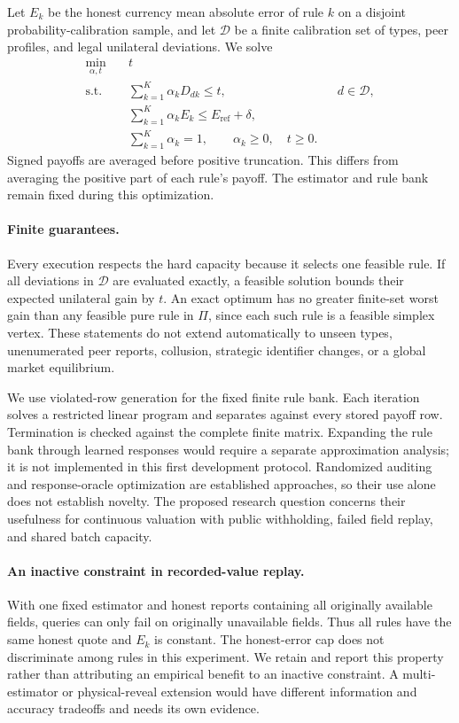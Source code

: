 \documentclass[10pt]{article}
\begin{document}
Let $E_k$ be the honest currency mean absolute error of rule $k$ on a disjoint
probability-calibration sample, and let $\mathcal{D}$ be a finite calibration
set of types, peer profiles, and legal unilateral deviations. We solve
\begin{align}
\min_{\alpha,t}\quad &t \\
\text{s.t.}\quad &\sum_{k=1}^K\alpha_kD_{dk}\leq t,
                   && d\in\mathcal{D},\\
&\sum_{k=1}^K\alpha_kE_k\leq E_{\mathrm{ref}}+\delta,\\
&\sum_{k=1}^K\alpha_k=1,\qquad\alpha_k\geq0,\quad t\geq0.
\end{align}
Signed payoffs are averaged before positive truncation. This differs from
averaging the positive part of each rule's payoff. The estimator and rule bank
remain fixed during this optimization.

\paragraph{Finite guarantees.}
Every execution respects the hard capacity because it selects one feasible
rule. If all deviations in $\mathcal{D}$ are evaluated exactly, a feasible
solution bounds their expected unilateral gain by $t$. An exact optimum has
no greater finite-set worst gain than any feasible pure rule in $\Pi$, since
each such rule is a feasible simplex vertex. These statements do not extend
automatically to unseen types, unenumerated peer reports, collusion, strategic
identifier changes, or a global market equilibrium.

We use violated-row generation for the fixed finite rule bank. Each iteration
solves a restricted linear program and separates against every stored payoff
row. Termination is checked against the complete finite matrix. Expanding the
rule bank through learned responses would require a separate approximation
analysis; it is not implemented in this first development protocol. Randomized
auditing and response-oracle optimization are established approaches, so their
use alone does not establish novelty. The proposed research question concerns
their usefulness for continuous valuation with public withholding, failed
field replay, and shared batch capacity.

\paragraph{An inactive constraint in recorded-value replay.}
With one fixed estimator and honest reports containing all originally available
fields, queries can only fail on originally unavailable fields. Thus all rules
have the same honest quote and $E_k$ is constant. The honest-error cap does not
discriminate among rules in this experiment. We retain and report this property
rather than attributing an empirical benefit to an inactive constraint. A
multi-estimator or physical-reveal extension would have different information
and accuracy tradeoffs and needs its own evidence.
\end{document}
